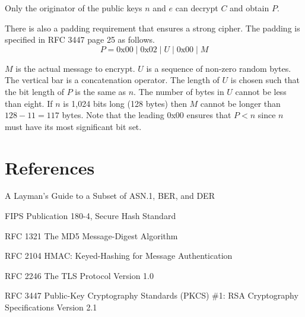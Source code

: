 \documentclass[12pt]{article}
\begin{document}
Only the originator of the public keys $n$ and $e$ can decrypt
$C$ and obtain $P$.

\bigskip
There is also a padding requirement that ensures a strong cipher.
The padding is specified in RFC 3447 page 25 as follows.
\begin{equation*}
P=\text{0x00}\mid\text{0x02}\mid U\mid\text{0x00}\mid M
\end{equation*}

$M$ is the actual message to encrypt.
$U$ is a sequence of non-zero random bytes.
The vertical bar is a concatenation operator.
The length of $U$ is chosen such that the bit length of $P$ is the
same as $n$.
The number of bytes in $U$ cannot be less than eight.
If $n$ is 1,024 bits long (128 bytes) then $M$ cannot be longer than
$128-11=117$ bytes.
Note that the leading 0x00 ensures that $P<n$ since $n$ must have
its most significant bit set.

\section*{References}

A Layman's Guide to a Subset of ASN.1, BER, and DER

\bigskip
FIPS Publication 180-4, Secure Hash Standard

\bigskip
RFC 1321 The MD5 Message-Digest Algorithm

\bigskip
RFC 2104 HMAC: Keyed-Hashing for Message Authentication

\bigskip
RFC 2246 The TLS Protocol Version 1.0

\bigskip
RFC 3447 Public-Key Cryptography Standards (PKCS) \#1: RSA Cryptography Specifications Version 2.1
\end{document}

